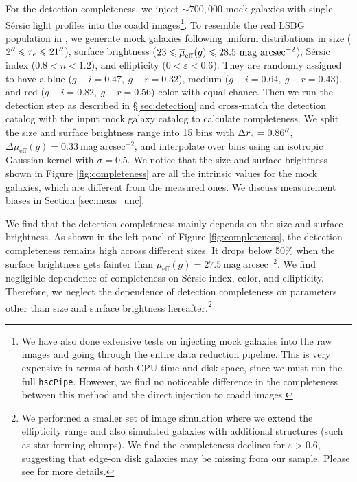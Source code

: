\documentclass[twocolumn,astrosymb,twocolappendix]{aastex631}
\newcommand{\sbunit}{\mathrm{mag\ arcsec}^{-2}}
\newcommand{\sbeff}{\overline{\mu}_{\mathrm{eff}}(g)}
\newcommand{\code}[1]{\texttt{#1}}
\newcommand{\sersic}{S\'ersic}
\begin{document}
\begin{CJK*}{UTF8}{gbsn}
For the detection completeness, we inject $\sim 700,000$ mock galaxies with single \sersic{} light profiles \citep{Sersic1963} into the coadd images\footnote{We have also done extensive tests on injecting mock galaxies into the raw images and going through the entire data reduction pipeline. This is very expensive in terms of both CPU time and disk space, since we must run the full \code{hscPipe}. However, we find no noticeable difference in the completeness between this method and the direct injection to coadd images.}. To resemble the real LSBG population in , we generate mock galaxies following uniform distributions in size ($2\mbox{$^{\prime\prime}$} \leqslant r_{e} \leqslant 21\mbox{$^{\prime\prime}$}$), surface brightness ($23 \leqslant \overline{\mu}_{\rm eff}(g) \leqslant 28.5\ \mathrm{mag\ arcsec^{-2}}$), \sersic{} index ($0.8 < n < 1.2$), and ellipticity ($0 < \varepsilon < 0.6$). They are randomly assigned to have a blue ($g-i=0.47,\ g-r=0.32$), medium ($g-i=0.64,\ g-r=0.43$), and red ($g-i=0.82,\ g-r=0.56$) color with equal chance. Then we run the detection step as described in \S \ref{sec:detection} and cross-match the detection catalog with the input mock galaxy catalog to calculate completeness. We split the size and surface brightness range into 15 bins with $\Delta r_e = 0.86\mbox{$^{\prime\prime}$}$, $\Delta \sbeff = 0.33\ \sbunit$, and interpolate over bins using an isotropic Gaussian kernel with $\sigma = 0.5$. We notice that the size and surface brightness shown in Figure \ref{fig:completeness} are all the intrinsic values for the mock galaxies, which are different from the measured ones. We discuss measurement biases in Section \ref{sec:meas_unc}.

We find that the detection completeness mainly depends on the size and surface brightness. As shown in the left panel of Figure \ref{fig:completeness}, the detection completeness remains high across different sizes. It drops below 50\% when the surface brightness gets fainter than $\sbeff = 27.5\ \sbunit$. We find negligible dependence of completeness on \sersic{} index, color, and ellipticity. Therefore, we neglect the dependence of detection completeness on parameters other than size and surface brightness hereafter.\footnote{We performed a smaller set of image simulation where we extend the ellipticity range and also simulated galaxies with additional structures (such as star-forming clumps). We find the completeness declines for $\varepsilon > 0.6$, suggesting that edge-on disk galaxies may be missing from our sample. Please see \citet{Greene2022} for more details.}


\end{CJK*}
\end{document}
